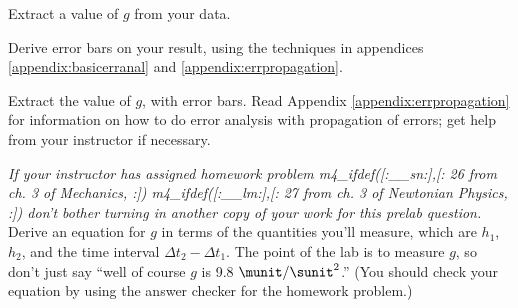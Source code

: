 \analysis

Extract a value of $g$ from your data.

Derive error bars on your result, using the techniques in appendices \ref{appendix:basicerranal}
and \ref{appendix:errpropagation}.

\selfcheck

Extract the value of $g$, with error bars.
Read Appendix \ref{appendix:errpropagation} for information on how to do error analysis
with propagation of errors; get help from your instructor if necessary.

\prelab

\prelabquestion  \emph{If your instructor has assigned homework problem 
m4_ifdef([:__sn:],[:%
26 from ch. 3 of Mechanics,%
:])%
m4_ifdef([:__lm:],[:%
27 from ch. 3 of Newtonian Physics,%
:])%
 don't bother turning in another copy of your work for this prelab
question.} Derive an equation for $g$ in terms of the
quantities you'll measure, which are $h_1$,
$h_2$, and the time interval $\Delta t_2-\Delta t_1$. The point of the lab
is to measure $g$, so don't just say ``well of course $g$ is
9.8 $\munit/\sunit^2$.'' (You should check your equation by using the answer
checker for the homework problem.)
